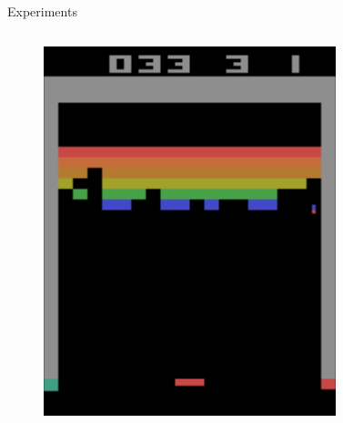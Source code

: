 \begin{frame}{Experiments}
\begin{columns}[c,onlytextwidth]
        \begin{figure}
            \includegraphics[width=\textwidth]{images/atari-sequence-1.png}
        \end{figure}
        \begin{figure}

\end{figure}
\end{columns}
\end{frame}
